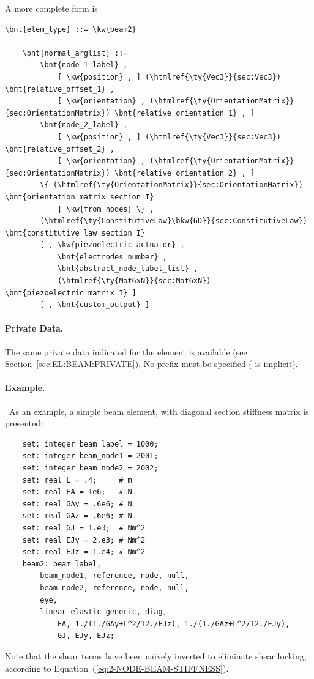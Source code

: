 A more complete form is
\begin{Verbatim}[commandchars=\\\{\}]
    \bnt{elem_type} ::= \kw{beam2}

    \bnt{normal_arglist} ::=
        \bnt{node_1_label} ,
            [ \kw{position} , ] (\htmlref{\ty{Vec3}}{sec:Vec3}) \bnt{relative_offset_1} ,
            [ \kw{orientation} , (\htmlref{\ty{OrientationMatrix}}{sec:OrientationMatrix}) \bnt{relative_orientation_1} , ]
        \bnt{node_2_label} ,
            [ \kw{position} , ] (\htmlref{\ty{Vec3}}{sec:Vec3}) \bnt{relative_offset_2} ,
            [ \kw{orientation} , (\htmlref{\ty{OrientationMatrix}}{sec:OrientationMatrix}) \bnt{relative_orientation_2} , ]
        \{ (\htmlref{\ty{OrientationMatrix}}{sec:OrientationMatrix}) \bnt{orientation_matrix_section_I}
            | \kw{from nodes} \} ,
        (\htmlref{\ty{ConstitutiveLaw}\bkw{6D}}{sec:ConstitutiveLaw}) \bnt{constitutive_law_section_I}
        [ , \kw{piezoelectric actuator} , 
            \bnt{electrodes_number} ,
            \bnt{abstract_node_label_list} ,
            (\htmlref{\ty{Mat6xN}}{sec:Mat6xN}) \bnt{piezoelectric_matrix_I} ]
        [ , \bnt{custom_output} ]
\end{Verbatim}

\paragraph{Private Data.}
The same private data indicated for the  element is available
(see Section~\ref{sec:EL:BEAM:PRIVATE}).
No prefix must be specified ( is implicit).


\paragraph{Example.} \
As an example, a simple beam element, with diagonal section stiffness 
matrix is presented:
\begin{verbatim}
    set: integer beam_label = 1000;
    set: integer beam_node1 = 2001;
    set: integer beam_node2 = 2002;
    set: real L = .4;     # m
    set: real EA = 1e6;   # N
    set: real GAy = .6e6; # N
    set: real GAz = .6e6; # N
    set: real GJ = 1.e3;  # Nm^2
    set: real EJy = 2.e3; # Nm^2
    set: real EJz = 1.e4; # Nm^2
    beam2: beam_label,
        beam_node1, reference, node, null,
        beam_node2, reference, node, null,
        eye,
        linear elastic generic, diag,
            EA, 1./(1./GAy+L^2/12./EJz), 1./(1./GAz+L^2/12./EJy),
            GJ, EJy, EJz;
\end{verbatim}
Note that the shear terms have been na\"{\i}vely inverted to eliminate
shear locking, according to Equation~(\ref{eq:2-NODE-BEAM-STIFFNESS}).



